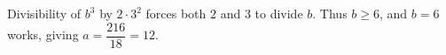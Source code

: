 Divisibility of $b^3$ by $2\cdot3^2$ forces both $2$ and $3$ to divide $b$. Thus $b\ge6$, and $b=6$ works, giving $a=\dfrac{216}{18}=\boxed{12}$.
